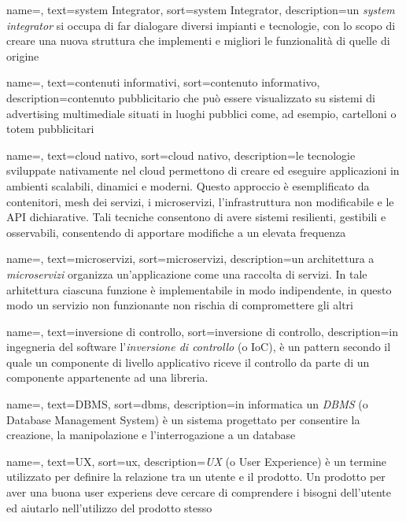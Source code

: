 {
    name=,
    text=system Integrator,
    sort=system Integrator,
    description={un \emph{system integrator} si occupa di far dialogare diversi impianti e tecnologie, con lo scopo di creare una nuova struttura che implementi e migliori le funzionalità di quelle di origine}
}

{
    name=,
    text=contenuti informativi,
    sort=contenuto informativo,
    description={contenuto pubblicitario che può essere visualizzato su sistemi di advertising multimediale situati in luoghi pubblici come, ad esempio, cartelloni o totem pubblicitari}
}

{
    name=,
    text=cloud nativo,
    sort=cloud nativo,
    description={le tecnologie sviluppate nativamente nel cloud permettono di creare ed eseguire applicazioni in ambienti scalabili, dinamici e moderni. Questo approccio è esemplificato da contenitori, mesh dei servizi, i microservizi, l'infrastruttura non modificabile e le API dichiarative. Tali tecniche consentono di avere sistemi resilienti, gestibili e osservabili, consentendo di apportare modifiche a un elevata frequenza}
}

{
    name=,
    text=microservizi,
    sort=microservizi,
    description={un architettura a \emph{microservizi} organizza un'applicazione come una raccolta di servizi. In tale arhitettura ciascuna funzione è implementabile in modo indipendente, in questo modo un servizio non funzionante non rischia di compromettere gli altri}
}

{
    name=,
    text=inversione di controllo,
    sort=inversione di controllo,
    description={in ingegneria del software l'\emph{inversione di controllo} (o IoC), è un pattern secondo il quale un componente di livello applicativo riceve il controllo da parte di un componente appartenente ad una libreria.}
}

{
    name=,
    text=DBMS,
    sort=dbms,
    description={in informatica un \emph{DBMS} (o Database Management System) è un sistema progettato per consentire la creazione, la manipolazione e l'interrogazione a un database}
}

{
    name=,
    text=UX,
    sort=ux,
    description={\emph{UX} (o User Experience) è un termine utilizzato per definire la relazione tra un utente e il prodotto. Un prodotto per aver una buona user experiens deve cercare di comprendere i bisogni dell'utente ed aiutarlo nell'utilizzo del prodotto stesso}
}

